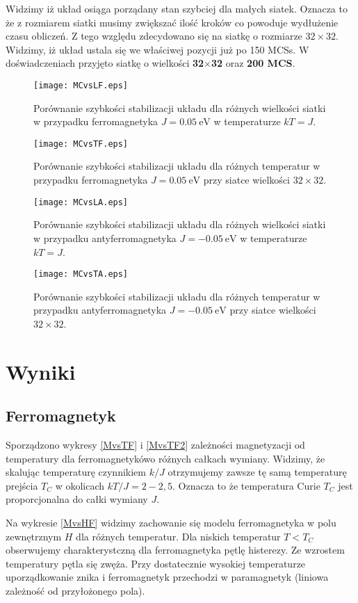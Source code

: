 \documentclass[11pt]{article}
\begin{document}
Widzimy iż układ osiąga porządany stan szybciej dla małych siatek. 
Oznacza to że z rozmiarem siatki musimy zwiększać ilość kroków 
co powoduje wydłużenie czasu obliczeń. Z tego względu zdecydowano się 
na siatkę o rozmiarze $32\times32$. Widzimy, iż układ ustala się 
we właściwej pozycji już po 150 MCSs. W doświadczeniach przyjęto 
siatkę o wielkości \textbf{32$\times$32} oraz \textbf{200 MCS}.
\begin{figure}
\centering
\texttt{[image: MCvsLF.eps]}
\caption{Porównanie szybkości stabilizacji układu dla różnych wielkości siatki
w przypadku ferromagnetyka $J=\SI{0.05}{\electronvolt}$ w temperaturze $kT=J$.}
{\label{MCvsLF}}
\end{figure}
\begin{figure}
\centering
\texttt{[image: MCvsTF.eps]}
\caption{Porównanie szybkości stabilizacji układu dla różnych temperatur
w przypadku ferromagnetyka $J=\SI{0.05}{\electronvolt}$ przy siatce wielkości 
$32\times 32$.}
{\label{MCvsTF}}
\end{figure}
\begin{figure}
\centering
\texttt{[image: MCvsLA.eps]}
\caption{Porównanie szybkości stabilizacji układu dla różnych wielkości siatki
w przypadku antyferromagnetyka $J=\SI{-0.05}{\electronvolt}$ w temperaturze $kT=J$.}
{\label{MCvsLA}}
\end{figure}
\begin{figure}
\centering
\texttt{[image: MCvsTA.eps]}
\caption{Porównanie szybkości stabilizacji układu dla różnych temperatur
w przypadku antyferromagnetyka $J=\SI{-0.05}{\electronvolt}$ przy siatce wielkości 
$32\times 32$.}
{\label{MCvsTA}}
\end{figure}
\section*{Wyniki}
\subsection*{Ferromagnetyk}
Sporządzono wykresy \ref{MvsTF} i \ref{MvsTF2} zależności magnetyzacji 
od temperatury dla ferromagnetykówo różnych całkach wymiany.
Widzimy, że skalując temperaturę czynnikiem $k/J$ otrzymujemy zawsze tę
samą temperaturę prejścia $T_C$ w okolicach $kT/J = 2-2,5$.
Oznacza to że temperatura Curie $T_C$ jest proporcjonalna do całki wymiany 
$J$.

Na wykresie \ref{MvsHF} widzimy zachowanie się modelu ferromagnetyka 
w polu zewnętrznym $H$ dla różnych temperatur. Dla niskich temperatur $T<T_C$
obserwujemy charakterystczną dla ferromagnetyka pętlę histerezy. Ze wzrostem 
temperatury pętla się zwęża.  Przy dostatecznie 
wysokiej temperaturze uporządkowanie znika i ferromagnetyk przechodzi w 
paramagnetyk (liniowa zależność od przyłożonego pola).
\end{document}
